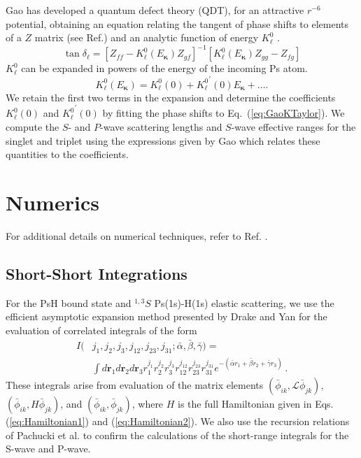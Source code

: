 \documentclass[preprint,showpacs,showkeys,preprintnumbers,amsmath,amssymb,longbibliography,pra,aps]{revtex4-1}
\begin{document}
Gao \cite{Gao1998} has developed a quantum defect theory (QDT),
for an attractive $r^{-6}$ potential, obtaining an equation relating
the tangent of phase shifts to elements of a $Z$ matrix
(see Ref.\cite{Gao1998}) and an analytic function of energy $K_\ell^0$
\cite{Gao1998a}.
\begin{equation}
\label{eq:GaoZEqn}
\tan\delta_\ell = [Z_{ff} - K_\ell^0(E_{\bm \kappa}) Z_{gf}]^{-1}
  [K_\ell^0(E_{\bm \kappa}) Z_{gg} - Z_{fg}]
\end{equation}
$K_\ell^0$ can be expanded in powers of the energy of the incoming Ps atom.
\begin{equation}
\label{eq:GaoKTaylor}
K_\ell^0(E_{\bm \kappa}) = K_\ell^0(0) + {K_\ell^0}^\prime(0) E_{\bm \kappa}
  + \ldots.
\end{equation}
We retain the first two terms in the expansion and determine the coefficients
$K_\ell^0(0)$ and ${K_\ell^0}^\prime(0)$ by fitting the phase shifts to
Eq.~(\ref{eq:GaoKTaylor}). We compute the $S$- and $P$-wave scattering lengths
and $S$-wave effective ranges for the singlet and triplet using the expressions
given by Gao \cite{Gao1998a} which relates these quantities to the
coefficients.


\section{Numerics}
\label{sec:Numerical}

For additional details on numerical techniques, refer to Ref. \cite{WoodsDiss2015}.

\subsection{Short-Short Integrations}
\label{sec:ShortInt}
For the PsH bound state and $^{1,3}S$ Ps(1s)-H(1s) elastic scattering, we use
the efficient asymptotic expansion method presented by Drake and Yan
\cite{Drake1995} for the evaluation of correlated integrals of the form
\begin{align}
\label{eq:ShortInt}
I(&j_1,j_2,j_3,j_{12},j_{23},j_{31}; \bar{\alpha}, \bar{\beta}, \bar{\gamma}) =
  \nonumber \\
&\int
d \textbf{r}_1 d \textbf{r}_2 d \textbf{r}_3
r_1^{j_1} r_2^{j_2} r_3^{j_3} r_{12}^{j_{12}}
r_{23}^{j_{23}} r_{31}^{j_{31}}
e^{-(\bar{\alpha} r_1 + \bar{\beta} r_2 + \bar{\gamma} r_3)}\, .
\end{align}
These integrals arise from evaluation of the matrix elements
$(\bar{\phi}_{ik}, \mathcal{L} \bar{\phi}_{jk})$,
$(\bar{\phi}_{ik}, H \bar{\phi}_{jk})$,
and $(\bar{\phi}_{ik}, \bar{\phi}_{jk})$, where $H$
is the full Hamiltonian given in Eqs. (\ref{eq:Hamiltonian1}) and
(\ref{eq:Hamiltonian2}). We also use the recursion relations of Pachucki
et al. \cite{Pachucki2004} to confirm the calculations of the short-range 
integrals for the S-wave and P-wave.
\end{document}
